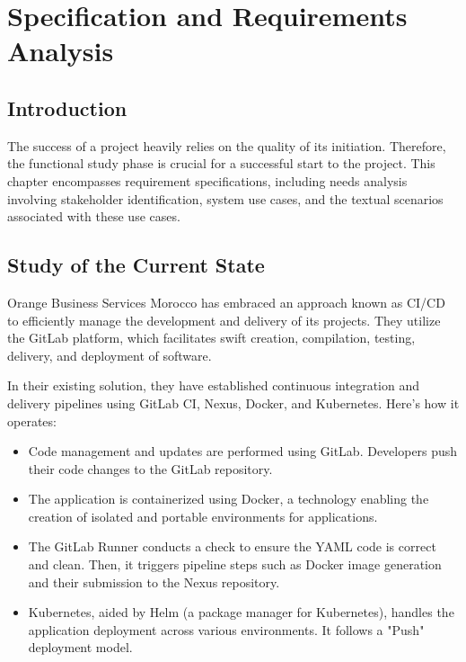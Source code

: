 \chapter{Specification and Requirements Analysis}
\label{chap:Chapter 2 title}
\section{Introduction}


The success of a project heavily relies on the quality of its initiation. Therefore, the functional study phase is crucial for a successful start to the project. This chapter encompasses requirement specifications, including needs analysis involving stakeholder identification, system use cases, and the textual scenarios associated with these use cases.

\pagebreak

\section{Study of the Current State}

Orange Business Services Morocco has embraced an approach known as CI/CD to efficiently manage the development and delivery of its projects. They utilize the GitLab platform, which facilitates swift creation, compilation, testing, delivery, and deployment of software.

In their existing solution, they have established continuous integration and delivery pipelines using GitLab CI, Nexus, Docker, and Kubernetes. Here's how it operates:

\begin{itemize}
  \item Code management and updates are performed using GitLab. Developers push their code changes to the GitLab repository.
  \item The application is containerized using Docker, a technology enabling the creation of isolated and portable environments for applications.
  \item The GitLab Runner conducts a check to ensure the YAML code is correct and clean. Then, it triggers pipeline steps such as Docker image generation and their submission to the Nexus repository.
  \item Kubernetes, aided by Helm (a package manager for Kubernetes), handles the application deployment across various environments. It follows a "Push" deployment model.
\end{itemize}

